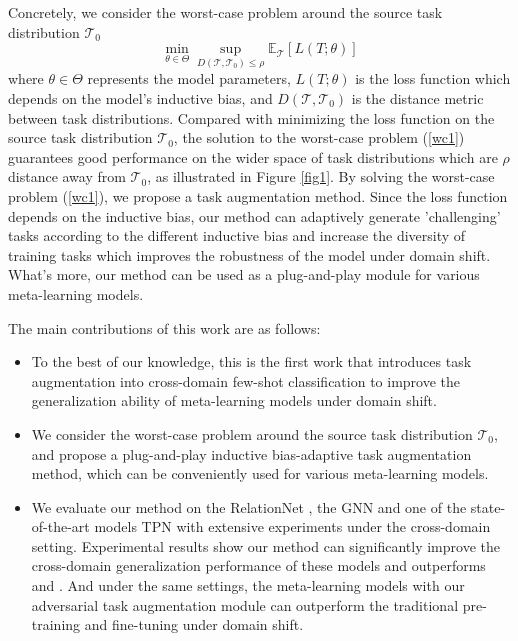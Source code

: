 \documentclass{article}
\begin{document}
Concretely, we consider the worst-case problem around the source task distribution $\mathcal{T}_0$
\begin{equation}\label{wc1}
    \min_{\theta\in\Theta}\sup_{D(\mathcal{T},\mathcal{T}_0)\leq\rho}\mathbb{E}_{\mathcal{T}}[L(T;\theta)]
\end{equation}
where $\theta\in\Theta$ represents the model parameters, $L(T;\theta)$ is the loss function which depends on the model's inductive bias, and $D(\mathcal{T},\mathcal{T}_0)$ is the distance metric between task distributions. Compared with minimizing the loss function on the source task distribution $\mathcal{T}_0$, the solution to the worst-case problem (\ref{wc1}) guarantees good performance on the wider space of task distributions which are $\rho$ distance away from $\mathcal{T}_0$, as illustrated in Figure \ref{fig1}. By solving the worst-case problem (\ref{wc1}), we propose a task augmentation method. Since the loss function depends on the inductive bias, our method can adaptively generate 'challenging' tasks according to the different inductive bias and increase the diversity of training tasks which improves the robustness of the model under domain shift. What's more, our method can be used as a plug-and-play module for various meta-learning models.

The main contributions of this work are as follows:
\begin{itemize}
\item To the best of our knowledge, this is the first work that introduces task augmentation into cross-domain few-shot classification to improve the generalization ability of meta-learning models under domain shift.
\item We consider the worst-case problem around the source task distribution $\mathcal{T}_0$, and propose a plug-and-play inductive bias-adaptive task augmentation method, which can be conveniently used for various meta-learning models.
\item We evaluate our method on the RelationNet \cite{sung2018learning}, the GNN \cite{garcia2018few} and one of the state-of-the-art models TPN \cite{liu2019learning} with extensive experiments under the cross-domain setting. Experimental results show our method can significantly improve the cross-domain generalization performance of these models and outperforms \cite{DBLP:conf/iclr/TsengLH020} and \cite{sun2020explanation}. And under the same settings, the meta-learning models with our adversarial task augmentation module can outperform the traditional pre-training and fine-tuning under domain shift.
\end{itemize}
\end{document}
